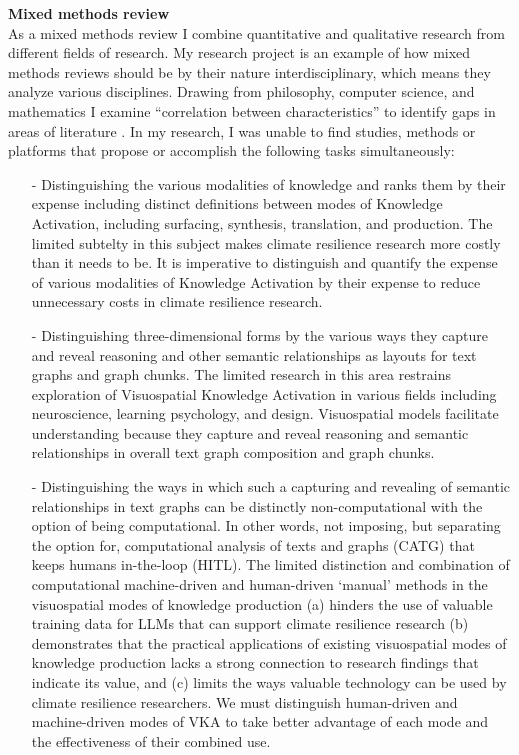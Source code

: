 \noindent \textbf{Mixed methods review} \\
As a mixed methods review I combine quantitative and qualitative research from different fields of research. My research project is an example of how mixed methods reviews should be by their nature interdisciplinary, which means they analyze various disciplines. Drawing from philosophy, computer science, and mathematics I examine “correlation between characteristics” to identify gaps in areas of literature \citep[p. 94-95]{grant_typology_2009}. In my research, I was unable to find studies, methods or platforms that propose or accomplish the following tasks simultaneously:
\begin{enumerate}
    \item[-] Distinguishing the various modalities of knowledge and ranks them by their expense including distinct definitions between modes of Knowledge Activation, including surfacing, synthesis, translation, and production. The limited subtelty in this subject makes climate resilience research more costly than it needs to be. It is imperative to distinguish and quantify the expense of various modalities of Knowledge Activation by their expense to reduce unnecessary costs in climate resilience research.
\item[-] Distinguishing three-dimensional forms by the various ways they capture and reveal reasoning and other semantic relationships as layouts for text graphs and graph chunks. The limited research in this area restrains exploration of Visuospatial Knowledge Activation in various fields including neuroscience, learning psychology, and design. Visuospatial models facilitate understanding because they capture and reveal reasoning and semantic relationships in overall text graph composition and graph chunks.
\item[-] Distinguishing the ways in which such a capturing and revealing of semantic relationships in text graphs can be distinctly non-computational with the option of being computational. In other words, not imposing, but separating the option for, computational analysis of texts and graphs (CATG) that keeps humans in-the-loop (HITL). The limited distinction and combination of computational machine-driven and human-driven ‘manual’ methods in the visuospatial modes of knowledge production (a) hinders the use of valuable training data for LLMs that can support climate resilience research (b) demonstrates that the practical applications of existing visuospatial modes of knowledge production lacks a strong connection to research findings that indicate its value, and (c) limits the ways valuable technology can be used by climate resilience researchers. We must distinguish human-driven and machine-driven modes of VKA to take better advantage of each mode and the effectiveness of their combined use.  

\end{enumerate}
